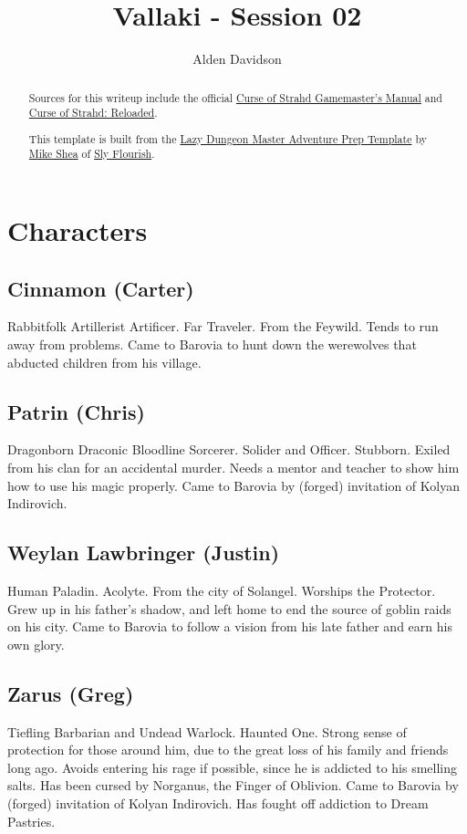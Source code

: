 \documentclass[a4paper,11pt]{article}
\title{Vallaki - Session 02}
\author{Alden Davidson}
\begin{document}
\maketitle
\tableofcontents

\begin{abstract}
  Sources for this writeup include the official
  \href{https://5e.tools/adventure.html#cos}{Curse of Strahd Gamemaster's Manual} and
  \href{https://www.reddit.com/r/CurseofStrahd/comments/9bpzbh/curse_of_strahd_reloaded_compilation_thread/}{Curse of Strahd: Reloaded}.
  
  This template is built from the
  \href{https://slyflourish.com/rotldm_template.html}{Lazy Dungeon Master Adventure Prep Template} by
  \href{https://slyflourish.com/about_mike_shea.html}{Mike Shea} of \href{https://slyflourish.com/}{Sly Flourish}.
\end{abstract}

\pagebreak
\section{Characters}
\label{sec:Characters}
\subsection{Cinnamon (Carter)}
  Rabbitfolk Artillerist Artificer. Far Traveler. From the Feywild. Tends to run away from problems. Came to
  Barovia to hunt down the werewolves that abducted children from his village.
\subsection{Patrin (Chris)}
  Dragonborn Draconic Bloodline Sorcerer. Solider and Officer. Stubborn. Exiled from his clan for an accidental 
  murder. Needs a mentor and teacher to show him how to use his magic properly. Came to Barovia by (forged)
  invitation of Kolyan Indirovich.
\subsection{Weylan Lawbringer (Justin)}
  Human Paladin. Acolyte. From the city of Solangel. Worships the Protector. Grew up in his father's shadow, and 
  left home to end the source of goblin raids on his city. Came to Barovia to follow a vision from his late 
  father and earn his own glory.
\subsection{Zarus (Greg)}
  Tiefling Barbarian and Undead Warlock. Haunted One. Strong sense of protection for those around him, due to the
  great loss of his family and friends long ago. Avoids entering his rage if possible, since he is addicted to 
  his smelling salts. Has been cursed by Norganus, the Finger of Oblivion. Came to Barovia by (forged) 
  invitation of Kolyan Indirovich. Has fought off addiction to Dream Pastries.
\end{document}
